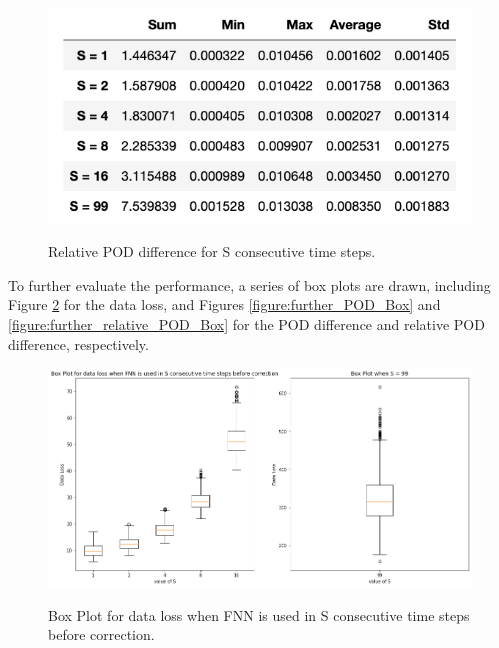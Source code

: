 \begin{figure}[H]
    \caption{Relative POD difference for S consecutive time steps.}
    \includegraphics[scale=0.7]{figures/mantle_convection_images/further_testings/Relative_POD_table.png}
    \label{figure:further_relative_POD}
\end{figure}

To further evaluate the performance, a series of box plots are drawn, including Figure \ref{figure:further_loss_Box} for the data loss, and Figures \ref{figure:further_POD_Box} and \ref{figure:further_relative_POD_Box} for the POD difference and relative POD difference, respectively.

\begin{figure}[H]
    \caption{Box Plot for data loss when FNN is used in S consecutive time steps before correction.}
    \includegraphics[scale=0.4]{figures/mantle_convection_images/further_testings/Data_Loss_boxplot.png}
    \label{figure:further_loss_Box}
\end{figure}

